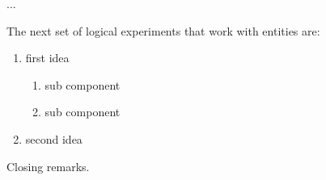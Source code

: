 \documentclass[11pt]{article} %
\begin{document}
...

The next set of logical experiments that work with entities are:
\begin{enumerate}
    \item first idea
          \begin{enumerate}
              \item sub component
              \item sub component
          \end{enumerate}
    \item second idea
\end{enumerate}

Closing remarks.

\clearpage

\printbibliography
\end{document}
